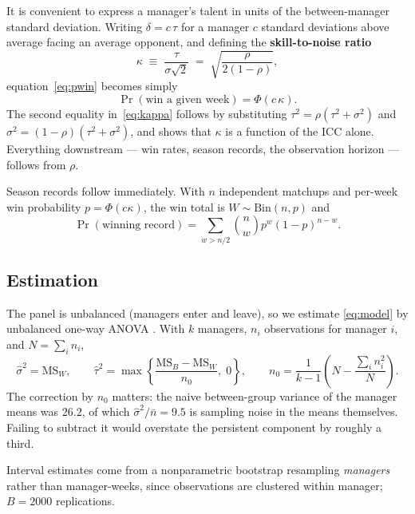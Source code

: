 \documentclass[11pt]{article}
\begin{document}
It is convenient to express a manager's talent in units of the between-manager
standard deviation. Writing $\delta = c\,\tau$ for a manager $c$ standard
deviations above average facing an average opponent, and defining the
\textbf{skill-to-noise ratio}
\begin{equation}
\kappa \;\equiv\; \frac{\tau}{\sigma\sqrt{2}}
\;=\; \sqrt{\frac{\rho}{2(1-\rho)}},
\label{eq:kappa}
\end{equation}
equation~\eqref{eq:pwin} becomes simply
\begin{equation}
\Pr(\text{win a given week}) = \Phi(c\,\kappa).
\label{eq:pk}
\end{equation}
The second equality in~\eqref{eq:kappa} follows by substituting
$\tau^2 = \rho(\tau^2+\sigma^2)$ and $\sigma^2 = (1-\rho)(\tau^2+\sigma^2)$, and
shows that $\kappa$ is a function of the ICC alone. Everything downstream ---
win rates, season records, the observation horizon --- follows from $\rho$.

Season records follow immediately. With $n$ independent matchups and per-week
win probability $p = \Phi(c\kappa)$, the win total is $W \sim \text{Bin}(n, p)$
and
\begin{equation}
\Pr(\text{winning record}) = \sum_{w > n/2} \binom{n}{w} p^w (1-p)^{n-w}.
\end{equation}

\subsection{Estimation}\label{sec:estimation}

The panel is unbalanced (managers enter and leave), so we estimate
\eqref{eq:model} by unbalanced one-way ANOVA \citep{searle1992}. With $k$
managers, $n_i$ observations for manager $i$, and $N = \sum_i n_i$,
\begin{equation}
\widehat{\sigma}^2 = \mathrm{MS}_W, \qquad
\widehat{\tau}^2 = \max\!\left\{ \frac{\mathrm{MS}_B - \mathrm{MS}_W}{n_0},\; 0 \right\},
\qquad
n_0 = \frac{1}{k-1}\left( N - \frac{\sum_i n_i^2}{N} \right).
\end{equation}
The correction by $n_0$ matters: the naive between-group variance of the
manager means was $26.2$, of which $\widehat\sigma^2 / \bar n = 9.5$ is sampling
noise in the means themselves. Failing to subtract it would overstate the
persistent component by roughly a third.

Interval estimates come from a nonparametric bootstrap resampling
\emph{managers} rather than manager-weeks, since observations are clustered
within manager; $B = 2000$ replications.
\end{document}
